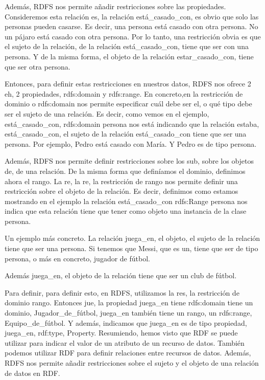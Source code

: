 Además, RDFS nos permite añadir restricciones sobre las propiedades. Consideremos esta relación es, la relación está_casado_con, es obvio que solo las personas pueden casarse. Es decir, una persona está casado con otra persona. No un pájaro está casado con otra persona. Por lo tanto, una restricción obvia es que el sujeto de la relación, de la relación está_casado_con, tiene que ser con una persona. Y de la misma forma, el objeto de la relación estar_casado_con, tiene que ser otra persona.

Entonces, para definir estas restricciones en nuestros datos, RDFS nos ofrece 2 eh, 2 propiedades, rdfs:domain y rdfs:range. En concreto,en la restricción de dominio o rdfs:domain nos permite especificar cuál debe ser el, o qué tipo debe ser el sujeto de una relación. Es decir, como vemos en el ejemplo, está_casado_con, rdfs:domain persona nos está indicando que la relación estaba, está_casado_con, el sujeto de la relación está_casado_con tiene que ser una persona. Por ejemplo, Pedro está casado con María. Y Pedro es de tipo persona.

Además, RDFS nos permite definir restricciones sobre los sub, sobre los objetos de, de una relación. De la misma forma que definíamos el dominio, definimos ahora el rango. La re, la re, la restricción de rango nos permite definir una restricción sobre el objeto de la relación. Es decir, definimos como estamos mostrando en el ejemplo la relación está_casado_con rdfs:Range persona nos indica que esta relación tiene que tener como objeto una instancia de la clase persona.

Un ejemplo más concreto. La relación juega_en, el objeto, el sujeto de la relación tiene que ser una persona. Si tenemos que Messi, que es un, tiene que ser de tipo persona, o más en concreto, jugador de fútbol.

Además juega_en, el objeto de la relación tiene que ser un club de fútbol.

Para definir, para definir esto, en RDFS, utilizamos la res, la restricción de dominio rango. Entonces jue, la propiedad juega_en tiene rdfs:domain tiene un dominio, Jugador_de_fútbol, juega_en también tiene un rango, un rdfs:range, Equipo_de_fútbol. Y además, indicamos que juega_en es de tipo propiedad, juega_en, rdf:type, Property. Resumiendo, hemos visto que RDF se puede utilizar para indicar el valor de un atributo de un recurso de datos. También podemos utilizar RDF para definir relaciones entre recursos de datos. Además, RDFS nos permite añadir restricciones sobre el sujeto y el objeto de una relación de datos en RDF.

